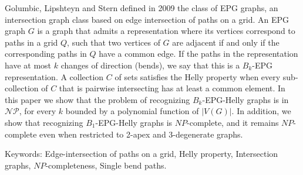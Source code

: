 \begin{foreignabstract}
Golumbic, Lipshteyn and Stern defined in 2009 the class of EPG graphs, an intersection graph class  based on edge intersection of paths on a grid. An EPG graph $G$ is a graph that admits a representation where its vertices correspond to paths in a grid $Q$, such that two vertices of $G$ are adjacent if and only if the corresponding paths in $Q$ have a common edge. If the paths in the representation have at most $k$ changes of direction  (bends), we say that this is a  $B_k$-EPG representation. A collection $C$ of sets satisfies the Helly property when every sub-collection of $C$ that is pairwise intersecting has at least a common element. In this paper we show that the problem of  recognizing $B_k$-EPG-Helly graphs  
 is in $\mathcal{NP}$, for every $k$ bounded by a polynomial function of $|V(G)|$. In addition, we show that recognizing $B_1$-EPG-Helly graphs is $NP$-complete, and it remains $NP$-complete even when restricted to 2-apex and 3-degenerate graphs.



Keywords: Edge-intersection of paths on a grid, Helly property, Intersection graphs, $NP$-completeness, Single bend paths.

\end{foreignabstract}

